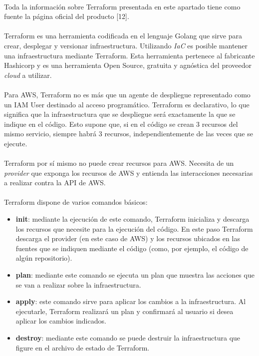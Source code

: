 \documentclass[../../memoria.tex]{subfiles}
\begin{document}
\paragraph{}
Toda la información sobre Terraform presentada en este apartado tiene como fuente la página oficial del producto [12].

\paragraph{}
Terraform es una herramienta codificada en el lenguaje Golang que sirve para crear, desplegar y versionar infraestructura. Utilizando \textit{IaC} es posible mantener una infraestructura mediante Terraform. Esta herramienta pertenece al fabricante Hashicorp y es una herramienta Open Source, gratuita y agnóstica del proveedor \textit{cloud} a utilizar.

\paragraph{}
Para AWS, Terraform no es más que un agente de despliegue representado como un IAM User destinado al acceso programático. Terraform es declarativo, lo que significa que la infraestructura que se despliegue será exactamente la que se indique en el código. Esto supone que, si en el código se crean 3 recursos del mismo servicio, siempre habrá 3 recursos, independientemente de las veces que se ejecute.

\paragraph{}
Terraform por sí mismo no puede crear recursos para AWS. Necesita de un \textit{provider} que exponga los recursos de AWS y entienda las interacciones necesarias a realizar contra la API de AWS.

\paragraph{}
Terraform dispone de varios comandos básicos:

\begin{itemize}
    \item \textbf{init}: mediante la ejecución de este comando, Terraform inicializa y descarga los recursos que necesite para la ejecución del código. En este paso Terraform descarga el provider (en este caso de AWS) y los recursos ubicados en las fuentes que se indiquen mediante el código (como, por ejemplo, el código de algún repositorio).
    \item \textbf{plan}: mediante este comando se ejecuta un plan que muestra las acciones que se van a realizar sobre la infraestructura.

    \item \textbf{apply}: este comando sirve para aplicar los cambios a la infraestructura. Al ejecutarle, Terraform realizará un plan y confirmará al usuario si desea aplicar los cambios indicados.

    \item \textbf{destroy}: mediante este comando se puede destruir la infraestructura que figure en el archivo de estado de Terraform.
\end{itemize}
\end{document}
